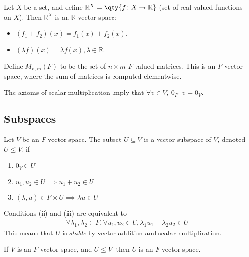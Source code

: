 \begin{example}
    Let $X$ be a set, and define $\mathbb R^X = \qty{ f \colon X \to \mathbb R}$ (set of real valued functions on $X$).
    Then $\mathbb R^X$ is an $\mathbb R$-vector space:
    \begin{itemize}
        \item $(f_1 + f_2)(x) = f_1(x) + f_2(x)$.
        \item $(\lambda f)(x) = \lambda f(x), \lambda \in \mathbb{R}$.
    \end{itemize}
\end{example}

\begin{example}
    Define $M_{n,m}(F)$ to be the set of $n \times m$ $F$-valued matrices.
    This is an $F$-vector space, where the sum of matrices is computed elementwise.
\end{example}

\begin{remark}
    The axioms of scalar multiplication imply that $\forall v \in V,\ 0_F \cdot v = 0_V$.
\end{remark}

\subsection{Subspaces}
\begin{definition}[Subspace]
    Let $V$ be an $F$-vector space.
    The subset $U \subseteq V$ is a vector subspace of $V$, denoted $U \leq V$, if
    \begin{enumerate}
        \item $0_V \in U$
        \item $u_1, u_2 \in U \implies u_1 + u_2 \in U$
        \item $(\lambda, u) \in F \times U \implies \lambda u \in U$
    \end{enumerate}
    Conditions (ii) and (iii) are equivalent to
    \begin{align*}
        \forall \lambda_1, \lambda_2 \in F, \forall u_1, u_2 \in U, \lambda_1 u_1 + \lambda_2 u_2 \in U
    \end{align*}
    This means that $U$ is \textit{stable} by vector addition and scalar multiplication.
\end{definition}

\begin{proposition}
    If $V$ is an $F$-vector space, and $U \leq V$, then $U$ is an $F$-vector space.
\end{proposition}

